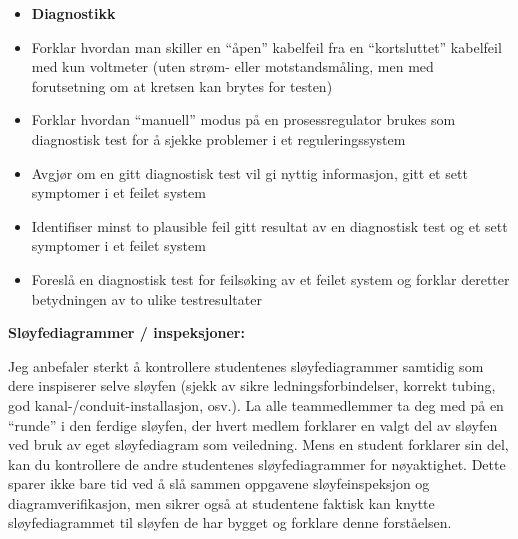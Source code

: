 \filbreak

\begin{itemize}
\item{} {\bf Diagnostikk}
\item{} Forklar hvordan man skiller en ``åpen'' kabelfeil fra en ``kortsluttet'' kabelfeil med kun voltmeter (uten strøm- eller motstandsmåling, men med forutsetning om at kretsen kan brytes for testen)
\item{} Forklar hvordan ``manuell'' modus på en prosessregulator brukes som diagnostisk test for å sjekke problemer i et reguleringssystem
\item{} Avgjør om en gitt diagnostisk test vil gi nyttig informasjon, gitt et sett symptomer i et feilet system
\item{} Identifiser minst to plausible feil gitt resultat av en diagnostisk test og et sett symptomer i et feilet system
\item{} Foreslå en diagnostisk test for feilsøking av et feilet system og forklar deretter betydningen av to ulike testresultater
\end{itemize}
















\noindent
{\bf Sløyfediagrammer / inspeksjoner:}

Jeg anbefaler sterkt å kontrollere studentenes sløyfediagrammer samtidig som dere inspiserer selve sløyfen (sjekk av sikre ledningsforbindelser, korrekt tubing, god kanal-/conduit-installasjon, osv.). La alle teammedlemmer ta deg med på en ``runde'' i den ferdige sløyfen, der hvert medlem forklarer en valgt del av sløyfen ved bruk av eget sløyfediagram som veiledning. Mens en student forklarer sin del, kan du kontrollere de andre studentenes sløyfediagrammer for nøyaktighet. Dette sparer ikke bare tid ved å slå sammen oppgavene sløyfeinspeksjon og diagramverifikasjon, men sikrer også at studentene faktisk kan knytte sløyfediagrammet til sløyfen de har bygget og forklare denne forståelsen.









